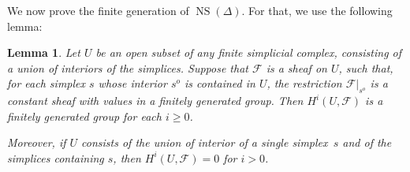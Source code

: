 \documentclass[11pt,reqno]{amsart}
\newtheorem{lem}[thm]{Lemma}
\theoremstyle{definition}
\newcommand{\cF}{\mathcal F}
\newcommand{\NS}{\operatorname{NS}}
\begin{document}
We now prove the finite generation of $\NS(\Delta)$. For that, we use the
following lemma:

\begin{lem}\label{l:finite-generation}
Let $U$ be an open subset of any finite simplicial complex, consisting of a
union of interiors of the simplices. Suppose that $\cF$ is a sheaf on $U$, such
that, for each simplex $s$ whose interior $s^o$ is contained in $U$, the
restriction $\cF \vert_{s^o}$ is a constant sheaf with values in a finitely
generated group. Then $H^i(U, \cF)$ is a finitely generated group for each $i
\geq 0$.

Moreover, if $U$ consists of the union of interior of a single simplex~$s$ and
of the simplices containing $s$, then $H^i(U, \cF) = 0$ for $i > 0$.
\end{lem}
\end{document}
